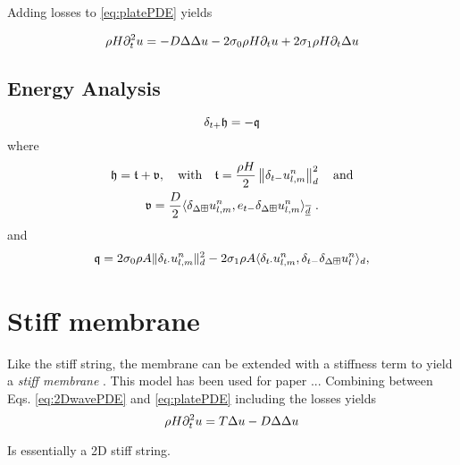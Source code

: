 Adding losses to \eqref{eq:platePDE} yields 

\begin{equation}\label{eq:platePDE}
    \rho H \partial_t^2 u = -D\Delta\Delta u - 2\sigma_{0} \rho H \partial_t u + 2 \sigma_{1}\rho H  \partial_t \Delta u
\end{equation}

\subsection{Energy Analysis}
\begin{equation}
    \delta_{t+} \mathfrak{h} = -\mathfrak{q} 
\end{equation}
where 
\begin{equation}\label{eq:energyBalanceThinPlate}
    \begin{gathered}
        \mathfrak{h} = \mathfrak{t} + \mathfrak{v}, \quad \text{with} \quad \mathfrak{t} = \frac{\rho H}{2} \left\lVert\delta_{t-}u_{l,m}^n\right\rVert_{d}^2 \quad \text{and} \\
        \mathfrak{v} = \frac{D}{2}\langle\delta_{\Delta\boxplus} u_{l,m}^n, e_{t-}\delta_{\Delta\boxplus} u_{l,m}^n\rangle_{\overline{\underline{d}}}\ .
    \end{gathered}
\end{equation}
and 
\begin{equation}\label{eq:dampingTermThinPlate}
    \mathfrak{q} = 2\sigma_{0} \rho A \lVert\delta_{t\cdot}u_{l,m}^n\rVert_d^2 - 2 \sigma_{1} \rho A \langle \delta_{t\cdot} u_{l,m}^n, \delta_{t-} \delta_{\Delta\boxplus}u_l^n \rangle_d,
\end{equation}

\section{Stiff membrane}
Like the stiff string, the membrane can be extended with a stiffness term to yield a \textit{stiff membrane} \cite{Fletcher1998}. This model has been used for paper \citeP[F]...
Combining between Eqs. \eqref{eq:2DwavePDE} and \eqref{eq:platePDE} including the losses yields
\begin{equation}\label{eq:stiffMembrane}
    \rho H \partial_t^2 u = T\Delta u - D
    \Delta\Delta u
\end{equation}


Is essentially a 2D stiff string. 
